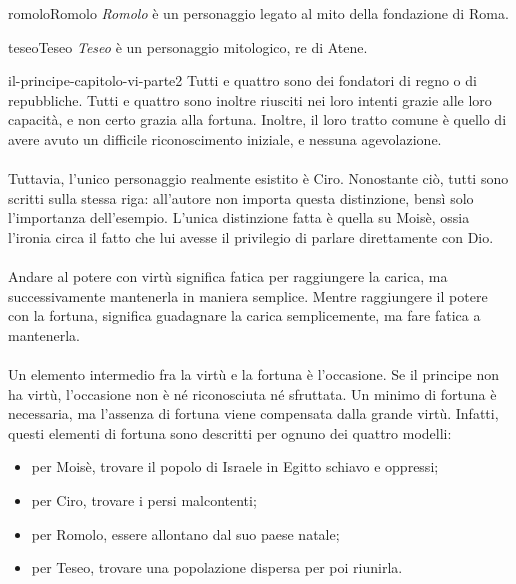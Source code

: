 \documentclass[preview]{standalone}
\begin{document}
\begin{snippetcharacter}{romolo}{Romolo}
    \textit{Romolo} è un personaggio legato al mito della fondazione di Roma.
\end{snippetcharacter}

\begin{snippetcharacter}{teseo}{Teseo}
    \textit{Teseo} è un personaggio mitologico, re di Atene.
\end{snippetcharacter}

\begin{snippet}{il-principe-capitolo-vi-parte2}
    Tutti e quattro sono dei fondatori di regno o di repubbliche.
    Tutti e quattro sono inoltre riusciti nei loro intenti grazie
    alle loro capacità, e non certo grazia alla fortuna.
    Inoltre, il loro tratto comune è quello di avere avuto un difficile riconoscimento iniziale,
    e nessuna agevolazione.
    \\\\
    Tuttavia, l'unico personaggio realmente esistito è Ciro.
    Nonostante ciò, tutti sono scritti sulla stessa riga: all'autore non importa
    questa distinzione, bensì solo l'importanza dell'esempio.
    L'unica distinzione fatta è quella su Moisè, ossia l'ironia circa il fatto che lui
    avesse il privilegio di parlare direttamente con Dio. 
    \\\\
    Andare al potere con virtù significa fatica per raggiungere la carica,
    ma successivamente mantenerla in maniera semplice.
    Mentre raggiungere il potere con la fortuna, significa guadagnare la carica semplicemente,
    ma fare fatica a mantenerla.
    \\\\
    Un elemento intermedio fra la virtù e la fortuna è l'occasione.
    Se il principe non ha virtù, l'occasione non è né riconosciuta né sfruttata.
    Un minimo di fortuna è necessaria, ma l'assenza di fortuna viene compensata dalla grande virtù.
    Infatti, questi elementi di fortuna sono descritti per ognuno dei quattro modelli:
    \begin{itemize}
        \item per Moisè, trovare il popolo di Israele in Egitto schiavo e oppressi;
        \item per Ciro, trovare i persi malcontenti;
        \item per Romolo, essere allontano dal suo paese natale;
        \item per Teseo, trovare una popolazione dispersa per poi riunirla.
    \end{itemize}


\end{snippet}
\end{document}
